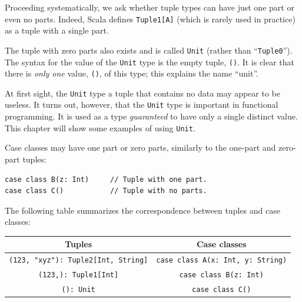 Proceeding systematically, we ask whether tuple types can have just
one part or even no parts. Indeed, Scala defines \lstinline!Tuple1[A]!
(which is rarely used in practice) as a tuple with a single part.

The tuple with zero parts also exists and is called \lstinline!Unit!
(rather than ``\lstinline!Tuple0!''). The syntax for the value
of the \lstinline!Unit! type is the empty tuple, \lstinline!()!.
It is clear that there is \emph{only one} value, \lstinline!()!,
of this type; this explains the name ``unit''. 

At first sight, the \lstinline!Unit! type \textemdash{} a tuple that
contains no data \textemdash{} may appear to be useless. It turns
out, however, that the \lstinline!Unit! type is important in functional
programming. It is used as a type \emph{guaranteed} to have only a
single distinct value. This chapter will show some examples of using
\lstinline!Unit!.

Case classes may have one part or zero parts, similarly to the one-part
and zero-part tuples:
\begin{lstlisting}
case class B(z: Int)     // Tuple with one part.
case class C()           // Tuple with no parts.
\end{lstlisting}

The following table summarizes the correspondence between tuples and
case classes:
\begin{center}
\begin{tabular}{|c|c|}
\hline 
\textbf{\small{}Tuples} & \textbf{\small{}Case classes}\tabularnewline
\hline 
\hline 
{\small{}}\lstinline!(123, "xyz"): Tuple2[Int, String]! & {\small{}}\lstinline!case class A(x: Int, y: String)!\tabularnewline
\hline 
{\small{}}\lstinline!(123,): Tuple1[Int]! & {\small{}}\lstinline!case class B(z: Int)!\tabularnewline
\hline 
{\small{}}\lstinline!(): Unit! & {\small{}}\lstinline!case class C()!\tabularnewline
\hline 
\end{tabular}
\par\end{center}

